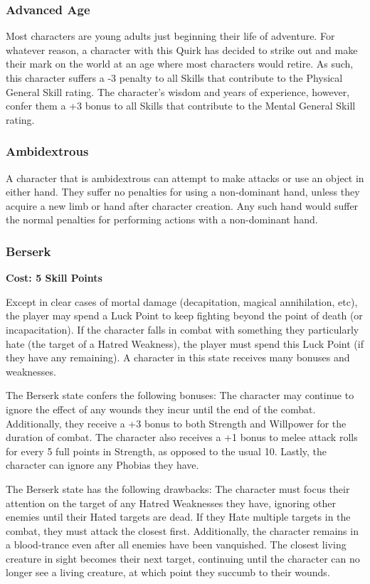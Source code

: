 \documentclass[oneside]{book}
\begin{document}
\begin{multicols}{2}

\subsubsection{Advanced Age}
Most characters are young adults just beginning their life of adventure. For whatever reason, a character with this Quirk has decided to strike out and make their mark on the world at an age where most characters would retire. As such, this character suffers a -3 penalty to all Skills that contribute to the Physical General Skill rating. The character's wisdom and years of experience, however, confer them a +3 bonus to all Skills that contribute to the Mental General Skill rating.

\subsubsection{Ambidextrous}
A character that is ambidextrous can attempt to make attacks or use an object in either hand. They suffer no penalties for using a non-dominant hand, unless they acquire a new limb or hand after character creation. Any such hand would suffer the normal penalties for performing actions with a non-dominant hand.

\subsubsection{Berserk}
\textbf{\small Cost: 5 Skill Points}

Except in clear cases of mortal damage (decapitation, magical annihilation, etc), the player may spend a Luck Point to keep fighting beyond the point of death (or incapacitation). If the character falls in combat with something they particularly hate (the target of a Hatred Weakness), the player must spend this Luck Point (if they have any remaining). A character in this state receives many bonuses and weaknesses.

The Berserk state confers the following bonuses: The character may continue to ignore the effect of any wounds they incur until the end of the combat. Additionally, they receive a +3 bonus to both Strength and Willpower for the duration of combat. The character also receives a +1 bonus to melee attack rolls for every 5 full points in Strength, as opposed to the usual 10. Lastly, the character can ignore any Phobias they have.

The Berserk state has the following drawbacks: The character must focus their attention on the target of any Hatred Weaknesses they have, ignoring other enemies until their Hated targets are dead. If they Hate multiple targets in the combat, they must attack the closest first. Additionally, the character remains in a blood-trance even after all enemies have been vanquished. The closest living creature in sight becomes their next target, continuing until the character can no longer see a living creature, at which point they succumb to their wounds. 


\end{multicols}
\end{document}
